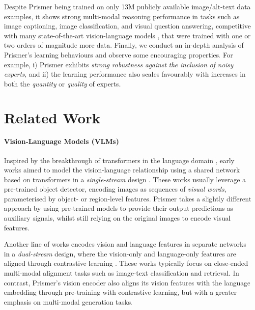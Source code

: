 \documentclass[11pt]{article}
\begin{document}
Despite Prismer being trained on only 13M publicly available image/alt-text data examples, it shows strong multi-modal reasoning performance in tasks such as image captioning, image classification, and visual question answering, competitive with many state-of-the-art vision-language models \cite{alayrac2022flamingo,wang2022git,wang2021simvlm}, that were trained with one or two orders of magnitude more data. Finally, we conduct an in-depth analysis of Prismer's learning behaviours and observe some encouraging properties. For example, i) Prismer exhibits {\it strong robustness against the inclusion of noisy experts}, and ii) the learning performance also scales favourably with increases in both the \textit{quantity} or \textit{quality} of experts.



\section{Related Work}
\label{sec:related}

\paragraph{Vision-Language Models (VLMs)}  Inspired by the breakthrough of transformers in the language domain \cite{vaswani2017transformer,devlin2019bert}, early works aimed to model the vision-language relationship using a shared network based on transformers in a {\it single-stream} design \cite{li2020visualbert,chen2020uniter,li2020oscar,su2020vlbert}. These works usually leverage a pre-trained object detector, encoding images as sequences of {\it visual words}, parameterised by object- or region-level features. Prismer takes a slightly different approach by using pre-trained models to provide their output predictions as auxiliary signals, whilst still relying on the original images to encode visual features.

Another line of works encodes vision and language features in separate networks in a {\it dual-stream} design, where the vision-only and language-only features are aligned through contrastive learning \cite{radford2021clip,zhai2022lit,jia2021align,li2021albef}. These works typically focus on close-ended multi-modal alignment tasks such as image-text classification and retrieval. In contrast, Prismer's vision encoder also aligns its vision features with the language embedding through pre-training with contrastive learning, but with a greater emphasis on multi-modal generation tasks. 
\end{document}
